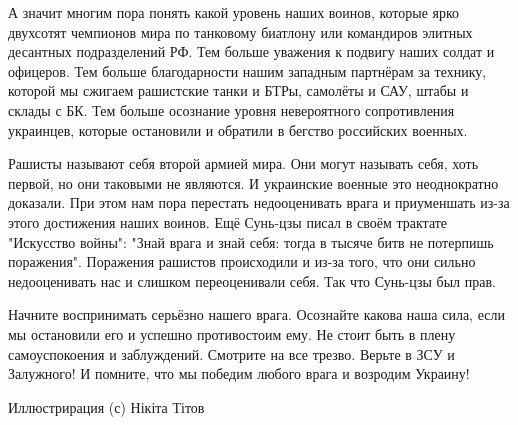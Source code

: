 А значит многим пора понять какой уровень наших воинов, которые ярко двухсотят
чемпионов мира по танковому биатлону или командиров элитных десантных
подразделений РФ. Тем больше уважения к подвигу наших солдат и офицеров. Тем
больше благодарности нашим западным партнёрам за технику, которой мы сжигаем
рашистские танки и БТРы, самолёты и САУ, штабы и склады с БК. Тем больше
осознание уровня невероятного сопротивления украинцев, которые остановили и
обратили в бегство российских военных. 

Рашисты называют себя второй армией мира. Они могут называть себя, хоть первой,
но они таковыми не являются. И украинские военные это неоднократно доказали.
При этом нам пора перестать недооценивать врага и приуменшать из-за этого
достижения наших воинов. Ещё Сунь-цзы писал в своём трактате "Искусство войны":
"Знай врага и знай себя: тогда в тысяче битв не потерпишь поражения". Поражения
рашистов происходили и из-за того, что они сильно недооценивать нас и слишком
переоценивали себя. Так что Сунь-цзы был прав. 

Начните воспринимать серьёзно нашего врага. Осознайте какова наша сила, если мы
остановили его и успешно противостоим ему. Не стоит быть в плену самоуспокоения
и заблуждений. Смотрите на все трезво. Верьте в ЗСУ и Залужного! И помните, что
мы победим любого врага и возродим Украину!

Иллюстрирация (с) Нікіта Тітов
